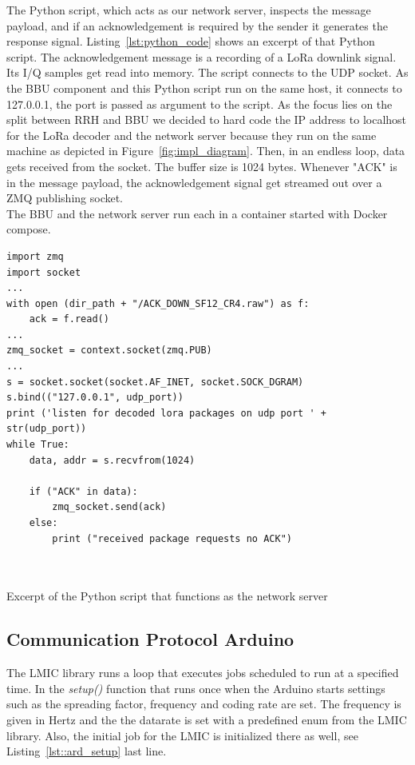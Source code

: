 The Python script, which acts as our network server, inspects the message payload, and if an 
acknowledgement is required by the sender it generates the response signal. 
Listing~\ref{lst:python_code} shows an excerpt of that Python script.
The acknowledgement message is a recording of a LoRa downlink signal. Its I/Q samples get read into memory.
The script connects to the UDP socket. As the BBU component and this Python script run on the same host, it connects
to 127.0.0.1, the port is passed as argument to the script. As the focus lies on the split between RRH and BBU we decided
to hard code the IP address to localhost for the LoRa decoder and the network server because they run on the same machine as depicted 
in Figure~\ref{fig:impl_diagram}. 
Then, in an endless loop, data gets received from the socket. The buffer size is 1024 bytes.
Whenever "ACK" is in the message payload, the acknowledgement signal get streamed out over a ZMQ publishing socket.
\\
The BBU and the network server run each in a container started with Docker compose.


\begin{listing}[h]
\begin{verbatim}
import zmq
import socket
...
with open (dir_path + "/ACK_DOWN_SF12_CR4.raw") as f:
    ack = f.read()
...
zmq_socket = context.socket(zmq.PUB)
...
s = socket.socket(socket.AF_INET, socket.SOCK_DGRAM)
s.bind(("127.0.0.1", udp_port))
print ('listen for decoded lora packages on udp port ' + str(udp_port))
while True:
    data, addr = s.recvfrom(1024)

    if ("ACK" in data):
        zmq_socket.send(ack) 
    else:
        print ("received package requests no ACK")
     
    
    \end{verbatim}
    \caption{Excerpt of the Python script that functions as the network server}
    \label{lst:python_code}
\end{listing}

\subsection{Communication Protocol Arduino}
\label{sec:comm_prot}

The LMIC library runs a loop that executes jobs scheduled to run at a specified time. 
In the \emph{setup()} function that runs once when the Arduino starts settings such as 
the spreading factor, frequency and coding rate are set. The frequency is given in Hertz and the the datarate 
is set with a predefined enum from the LMIC library. Also, the initial job for the LMIC is initialized there as well, see 
Listing~\ref{lst::ard_setup} last line.

